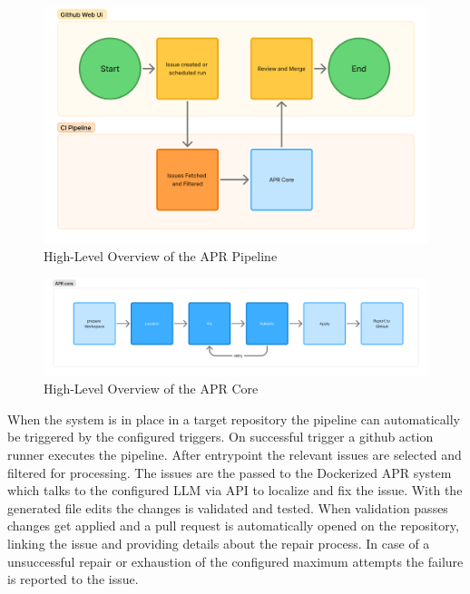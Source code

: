 \begin{figure}[H]
    \centering
    \includegraphics[width=1\textwidth]{images/flowcharts/high-level.png}
    \caption{High-Level Overview of the APR Pipeline}
    \label{fig:high-level}
\end{figure}

\begin{figure}[H]
    \centering
    \includegraphics[width=1\textwidth]{images/flowcharts/agent-core-high-level.png}
    \caption{High-Level Overview of the APR Core}
    \label{fig:apr-core-high-level}
\end{figure}

When the system is in place in a target repository the pipeline can automatically be triggered by the configured triggers. On successful trigger a github action runner executes the pipeline. After entrypoint the relevant issues are selected and filtered for processing. The issues are the passed to the Dockerized APR system which talks to the configured LLM via API to localize and fix the issue. With the generated file edits the changes is validated and tested. When validation passes changes get applied and a pull request is automatically opened on the repository, linking the issue and providing details about the repair process. In case of a unsuccessful repair or exhaustion of the configured maximum attempts the failure is reported to the issue.

